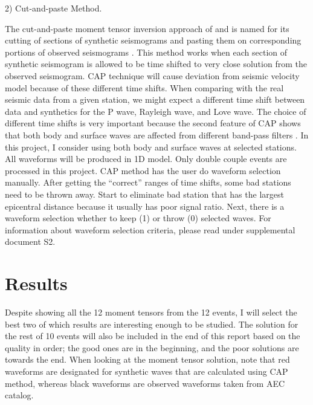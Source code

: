 \documentclass[11pt,titlepage,fleqn]{article}
\begin{document}
\vspace{2mm}

2)    Cut-and-paste Method.

\vspace{2mm}

The cut-and-paste moment tensor inversion approach of \citet{ZhaoHelm1994} and \citet{ZhuHelm1996} is named for its cutting of sections of synthetic seismograms and pasting them on corresponding portions of observed seismograms \citep{SilwalTape2016}. This method works when each section of synthetic seismogram is allowed to be time shifted to very close solution from the observed seismogram. CAP technique will cause deviation from seismic velocity model because of these different time shifts. When comparing with the real seismic data from a given station, we might expect a different time shift between data and synthetics for the P wave, Rayleigh wave, and Love wave. The choice of different time shifts is very important because the second feature of CAP shows that both body and surface waves are affected from different band-pass filters \citep{SilwalTape2016}. In this project, I consider using both body and surface waves at selected stations. All waveforms will be produced in 1D model. Only double couple events are processed in this project.
CAP method has the user do waveform selection manually. After getting the “correct” ranges of time shifts, some bad stations need to be thrown away. Start to eliminate bad station that has the largest epicentral distance because it usually has poor signal ratio. Next, there is a waveform selection whether to keep (1) or throw (0) selected waves. For information about waveform selection criteria, please read \citet{SilwalTape2016} under supplemental document S2.

\section{Results}

Despite showing all the 12 moment tensors from the 12 events, I will select the best two of which results are interesting enough to be studied. The solution for the rest of 10 events will also be included in the end of this report based on the quality in order; the good ones are in the beginning, and the poor solutions are towards the end. When looking at the moment tensor solution, note that red waveforms are designated for synthetic waves that are calculated using CAP method, whereas black waveforms are observed waveforms taken from AEC catalog. 
\end{document}
